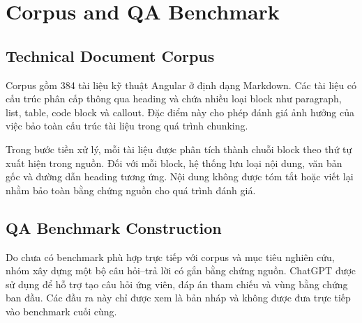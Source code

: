 

\section{Corpus and QA Benchmark}
\label{sec:dataset}

\subsection{Technical Document Corpus}

Corpus gồm 384 tài liệu kỹ thuật Angular ở định dạng Markdown. Các tài liệu có cấu trúc phân cấp thông qua heading và chứa nhiều loại block như paragraph, list, table, code block và callout. Đặc điểm này cho phép đánh giá ảnh hưởng của việc bảo toàn cấu trúc tài liệu trong quá trình chunking.

Trong bước tiền xử lý, mỗi tài liệu được phân tích thành chuỗi block theo thứ tự xuất hiện trong nguồn. Đối với mỗi block, hệ thống lưu loại nội dung, văn bản gốc và đường dẫn heading tương ứng. Nội dung không được tóm tắt hoặc viết lại nhằm bảo toàn bằng chứng nguồn cho quá trình đánh giá.

\subsection{QA Benchmark Construction}

Do chưa có benchmark phù hợp trực tiếp với corpus và mục tiêu nghiên cứu, nhóm xây dựng một bộ câu hỏi--trả lời có gắn bằng chứng nguồn. ChatGPT được sử dụng để hỗ trợ tạo câu hỏi ứng viên, đáp án tham chiếu và vùng bằng chứng ban đầu. Các đầu ra này chỉ được xem là bản nháp và không được đưa trực tiếp vào benchmark cuối cùng.

